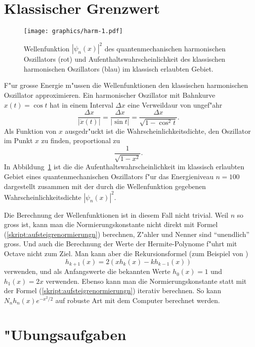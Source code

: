 \section{Klassischer Grenzwert}
\begin{figure}
\centering
\texttt{[image: graphics/harm-1.pdf]}
\caption{Wellenfunktion $|\psi_n(x)|^2$ des quantenmechanischen 
harmonischen Oszillators (rot) und Aufenthaltswahrscheinlichkeit des
klassischen harmonischen Oszillators (blau) im klassisch erlaubten
Gebiet.
\label{skript:harmklass}}
\end{figure}
F"ur grosse Energie m"ussen die Wellenfunktionen den klassischen
harmonischen Oszillator approximieren.
Ein harmonischer Oszillator mit Bahnkurve $x(t)=\cos t$ hat in einem
Interval $\Delta x$ eine Verweildaur von ungef"ahr
\[
\frac{\Delta x}{|\dot x(t)|}=\frac{\Delta x}{|\sin t|}
=\frac{\Delta x}{\sqrt{1-\cos^2t}}.
\]
Als Funktion von $x$ ausgedr"uckt ist die Wahrscheinlichkeitsdichte,
den Oszillator im Punkt $x$ zu finden, proportional zu
\[
\frac{1}{\sqrt{1-x^2}}.
\]
In Abbildung~\ref{skript:harmklass} ist die die Aufenthaltswahrscheinlichkeit
im klassisch erlaubten Gebiet eines quantenmechanischen Oszillators f"ur
das Energieniveau $n=100$ dargestellt zusammen mit der durch die
Wellenfunktion gegebenen Wahrscheinlichkeitsdichte $|\psi_n(x)|^2$.

Die Berechnung der Wellenfunktionen ist in diesem Fall nicht trivial.
Weil $n$ so gross ist, kann man die Normierungskonstante nicht direkt
mit Formel (\ref{skript:aufsteigrenormierungn}) berechnen, Z"ahler und
Nenner sind ``unendlich'' gross.
Und auch die Berechnung der Werte der Hermite-Polynome f"uhrt mit Octave
nicht zum Ziel.
Man kann aber die Rekursionsformel (zum Beispiel von \cite{skript:hermite})
\[
h_{k+1}(x) = 2 (x h_k(x) - k h_{k-1}(x))
\]
verwenden, und als Anfangswerte die bekannten Werte $h_0(x)=1$ und $h_1(x)=2x$
verwenden.
Ebenso kann man die Normierungskonstante statt mit der Formel
(\ref{skript:aufsteigrenormierungn}) iterativ berechnen.
So kann $N_nh_n(x)e^{-x^2/2}$ auf robuste Art mit dem Computer berechnet
werden.


\section*{"Ubungsaufgaben}
\begin{uebungsaufgaben}
\item

\item

\end{uebungsaufgaben}

